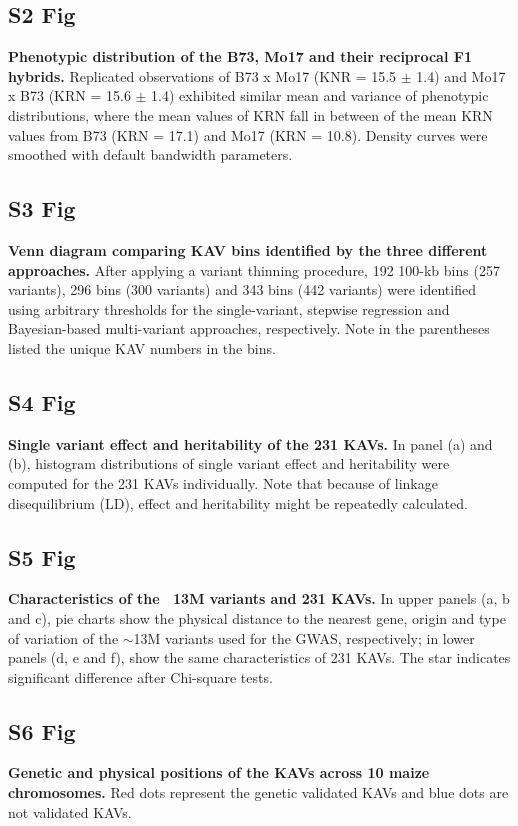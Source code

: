 \documentclass[10pt,letterpaper]{article}
\begin{document}
\subsection*{S2 Fig}
\label{Fig_S2}
{\bf Phenotypic distribution of the B73, Mo17 and their reciprocal F1 hybrids.} Replicated observations of B73 x Mo17 (KNR = 15.5 $\pm$ 1.4) and Mo17 x B73 (KRN = 15.6 $\pm$ 1.4) exhibited similar mean and variance of phenotypic distributions, where the mean values of KRN fall in between of the mean KRN values from B73 (KRN = 17.1) and Mo17 (KRN = 10.8). Density curves were smoothed with default bandwidth parameters.

\subsection*{S3 Fig}
\label{Fig_S3}
{\bf Venn diagram comparing KAV bins identified by the three different approaches.} After applying a variant thinning procedure, 192 100-kb bins (257 variants), 296 bins (300 variants) and 343 bins (442 variants) were identified using arbitrary thresholds for the single-variant, stepwise regression and Bayesian-based multi-variant approaches, respectively. Note in the parentheses listed the unique KAV numbers in the bins.

\subsection*{S4 Fig}
\label{Fig_S4}
{\bf Single variant effect and heritability of the 231 KAVs.} In panel (a) and (b), histogram distributions of single variant effect and heritability were computed for the 231 KAVs individually. Note that because of linkage disequilibrium (LD), effect and heritability might be repeatedly calculated.

\subsection*{S5 Fig}
\label{Fig_S5}
{\bf Characteristics of the ~13M variants and 231 KAVs. } In upper panels (a, b and c), pie charts show the physical distance to the nearest gene, origin and type of variation of the $\sim$13M variants used for the GWAS, respectively; in lower panels (d, e and f), show the same characteristics of 231 KAVs. The star indicates significant difference after Chi-square tests.

\subsection*{S6 Fig}
\label{Fig_S6}
{\bf Genetic and physical positions of the KAVs across 10 maize chromosomes.} Red dots represent the genetic validated KAVs and blue dots are not validated KAVs.
\end{document}
